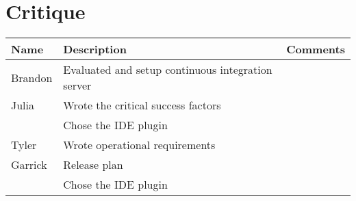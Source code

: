 \section{Critique}
\begin{tabular}{| l | l | l |}
\hline
Name & Description & Comments \\
\hline
Brandon & Evaluated and setup continuous integration server \\
\hline
Julia & Wrote the critical success factors \\
 & Chose the IDE plugin \\
\hline
Tyler & Wrote operational requirements \\
\hline
Garrick & Release plan \\
 & Chose the IDE plugin \\
\hline
\end{tabular}

